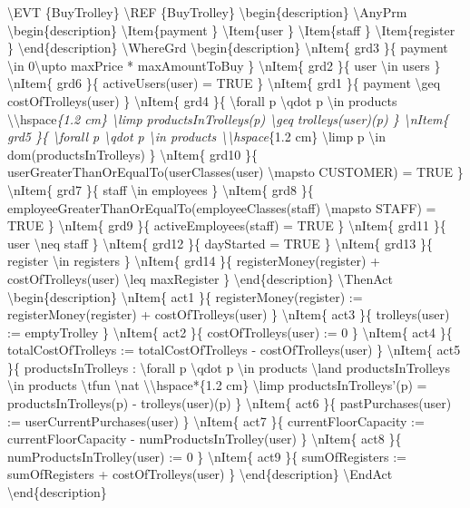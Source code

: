 \textbackslash{}EVT \{BuyTrolley\}
\textbackslash{}REF \{BuyTrolley\}
\textbackslash{}begin\{description\}
\textbackslash{}AnyPrm
\textbackslash{}begin\{description\}
\textbackslash{}Item\{payment \}
\textbackslash{}Item\{user \}
\textbackslash{}Item\{staff \}
\textbackslash{}Item\{register \}
\textbackslash{}end\{description\}
\textbackslash{}WhereGrd
\textbackslash{}begin\{description\}
\textbackslash{}nItem\{ grd3 \}\{ payment \textbackslash{}in 0\textbackslash{}upto maxPrice * maxAmountToBuy \}
\textbackslash{}nItem\{ grd2 \}\{ user \textbackslash{}in users \}
\textbackslash{}nItem\{ grd6 \}\{ activeUsers(user) = TRUE \}
\textbackslash{}nItem\{ grd1 \}\{ payment \textbackslash{}geq costOfTrolleys(user) \}
\textbackslash{}nItem\{ grd4 \}\{ \textbackslash{}forall p \textbackslash{}qdot p \textbackslash{}in products
\textbackslash{}\textbackslash{}hspace\emph{\{1.2 cm\} \textbackslash{}limp productsInTrolleys(p) \textbackslash{}geq trolleys(user)(p) \}
\textbackslash{}nItem\{ grd5 \}\{ \textbackslash{}forall p \textbackslash{}qdot p \textbackslash{}in products
\textbackslash{}\textbackslash{}hspace}\{1.2 cm\} \textbackslash{}limp p \textbackslash{}in dom(productsInTrolleys) \}
\textbackslash{}nItem\{ grd10 \}\{ userGreaterThanOrEqualTo(userClasses(user) \textbackslash{}mapsto CUSTOMER) = TRUE \}
\textbackslash{}nItem\{ grd7 \}\{ staff \textbackslash{}in employees \}
\textbackslash{}nItem\{ grd8 \}\{ employeeGreaterThanOrEqualTo(employeeClasses(staff) \textbackslash{}mapsto STAFF) = TRUE \}
\textbackslash{}nItem\{ grd9 \}\{ activeEmployees(staff) = TRUE \}
\textbackslash{}nItem\{ grd11 \}\{ user \textbackslash{}neq staff \}
\textbackslash{}nItem\{ grd12 \}\{ dayStarted = TRUE \}
\textbackslash{}nItem\{ grd13 \}\{ register \textbackslash{}in registers \}
\textbackslash{}nItem\{ grd14 \}\{ registerMoney(register) + costOfTrolleys(user) \textbackslash{}leq maxRegister \}
\textbackslash{}end\{description\}
\textbackslash{}ThenAct
\textbackslash{}begin\{description\}
\textbackslash{}nItem\{ act1 \}\{ registerMoney(register) := registerMoney(register) + costOfTrolleys(user) \}
\textbackslash{}nItem\{ act3 \}\{ trolleys(user) := emptyTrolley \}
\textbackslash{}nItem\{ act2 \}\{ costOfTrolleys(user) := 0 \}
\textbackslash{}nItem\{ act4 \}\{ totalCostOfTrolleys := totalCostOfTrolleys - costOfTrolleys(user) \}
\textbackslash{}nItem\{ act5 \}\{ productsInTrolleys :\textbar{} \textbackslash{}forall p \textbackslash{}qdot p \textbackslash{}in products \textbackslash{}land productsInTrolleys \textbackslash{}in products \textbackslash{}tfun \textbackslash{}nat
\textbackslash{}\textbackslash{}hspace*\{1.2 cm\} \textbackslash{}limp productsInTrolleys'(p) = productsInTrolleys(p) - trolleys(user)(p) \}
\textbackslash{}nItem\{ act6 \}\{ pastPurchases(user) := userCurrentPurchases(user) \}
\textbackslash{}nItem\{ act7 \}\{ currentFloorCapacity := currentFloorCapacity - numProductsInTrolley(user) \}
\textbackslash{}nItem\{ act8 \}\{ numProductsInTrolley(user) := 0 \}
\textbackslash{}nItem\{ act9 \}\{ sumOfRegisters := sumOfRegisters + costOfTrolleys(user) \}
\textbackslash{}end\{description\}
\textbackslash{}EndAct
\textbackslash{}end\{description\}

